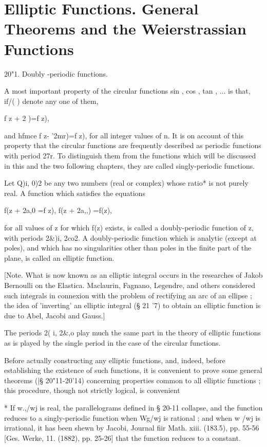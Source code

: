 \chapter{Elliptic Functions. General Theorems and the 
Weierstrassian Functions} 

20"1. Doubly -periodic functions.

A most important property of the circular functions sin , cos , tan ,
... is that, if/( ) denote any one of them,

f z + 2 )=f z),

and hfmce f z- '2mr)=f z), for all integer values of n. It is on
account of this property that the circular functions are frequently
described as periodic functions with period 27r. To distinguish them
from the functions which will be discussed in this and the two
following chapters, they are called singly-periodic functions.

Let Q)i, 0)2 be any two numbers (real or complex) whose ratio* is not
purely real. A function which satisfies the equations

f(z + 2a,0 =f z), f(z + 2a,,) =f(z),

for all values of z for which f(z) exists, is called a doubly-periodic
function of z, with periods 2\&)i, 2co2. A doubly-periodic function
which is analytic (except at poles), and which has no singularities
other than poles in the finite part of the plane, is called an
elliptic function.

[Note. What is now known as an elliptic integral occurs in the
researches of Jakob Bernoulli on the Elastica. Maclaurin, Fagnano,
Legendre, and others considered such integrals in connexion with the
problem of rectifying an arc of an ellipse ; the idea of 'inverting'
an elliptic integral (§ 21 '7) to obtain an elliptic function is due
to Abel, Jacobi and Gauss.]

The periods 2( i, 2\&,o play much the same part in the theory of
elliptic functions as is played by the single period in the case of
the circular functions.

Before actually constructing any elliptic functions, and, indeed,
before establishing the existence of such functions, it is convenient
to prove some general theorems (|§ 20"11-20'14) concerning properties
common to all elliptic functions ; this procedure, though not strictly
logical, is convenient

* If w.,/wj is real, the parallelograms defined in § 20-11 collapse,
and the function reduces to a singly-periodic function when Wg/wj is
rational ; and when w /wj is irrational, it has been shewn by Jacobi,
Journal fiir Math. xiii. (183.5), pp. 55-56 [Ges. Werke, 11. (1882),
pp. 25-26] that the function reduces to a constant.

